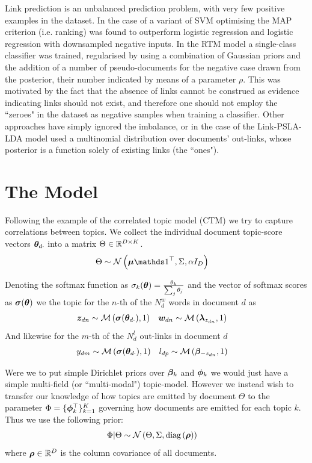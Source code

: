 Link prediction is an unbalanced prediction problem, with very few positive examples in the dataset. In the case of \cite{Bethard2010} a variant of SVM optimising the MAP criterion\cite{Yue2007} (i.e. ranking) was found to outperform logistic regression and logistic regression with downsampled negative inputs. In the RTM model\cite{Chang2009a}\cite{Chang2010a} a single-class classifier was trained, regularised by using a combination of Gaussian priors and the addition of a number of pseudo-documents for the negative case drawn from the posterior, their number indicated by means of a parameter $\rho$. This was motivated by the fact that the absence of links cannot be construed as evidence indicating links should not exist, and therefore one should not employ the ``zeroes" in the dataset as negative samples when training a classifier. Other approaches have simply ignored the imbalance, or in the case of the Link-PSLA-LDA model\cite{Nallapati2008}\cite{Nallapati2008a} used a multinomial distribution over documents' out-links, whose posterior is a function solely of existing links (the ``ones").


\section{The Model}
Following the example of the correlated topic model (CTM)\cite{Blei2006} we try to capture correlations between topics. We collect the individual document topic-score vectors ${ \bm \theta_{d\cdot} }$ into a matrix $\Theta \in { \mathbb{R}^{D \times K} }$. 
\begin{align}
\Theta &\sim \mnor{\vv{\mu}\one\T}{\Sigma}{\alpha I_D}
\end{align}

Denoting the softmax function as $\sigma_k(\bm \theta) = \frac{\theta_k}{\sum_j \theta_j}$ and the vector of softmax scores as $\bm \sigma(\bm \theta)$ we 
the topic for the $n$-th of the $N^w_d$ words in document $d$ as
\begin{align}
{  \bm z _{dn} } & \sim \mathcal{M} \left( {\bm \sigma({ \bm \theta_{d\cdot} })},{1} \right) &
{ \bm w_{dn} } & \sim \mathcal{M} \left( {\bm \lambda_{z_{dn}}},{1} \right)
\end{align}
And likewise for the $m$-th of the $N^l_d$ out-links in document $d$
\begin{align}
y_{dm} & \sim \mathcal{M} \left( {\bm \sigma({ \bm \theta_{d\cdot} })},{1} \right) &
l_{dp} & \sim \mathcal{M} \left( {\bm \beta_{- z_{dn}}},{1} \right)
\end{align}

Were we to put simple Dirichlet priors over $\bm \beta_k$ and $\bm \phi_k$ we would just have a simple multi-field (or ``multi-modal") topic-model\cite{Salomatin2009}. However we instead wish to transfer our knowledge of how topics are emitted by document $\Theta$ to the parameter $\Phi = \{ \bm \phi_k^\top \}_{k=1}^K$ governing how documents are emitted for each topic $k$. Thus we use the following prior:
\begin{align}
\Phi|\Theta & \sim \mathcal{N} \left(\Theta, \Sigma, \text{diag} \left( {\bm \rho} \right)\right)
\end{align}
where $\bm \rho \in { \mathbb{R}^{D} }$ is the column covariance of all documents. 

